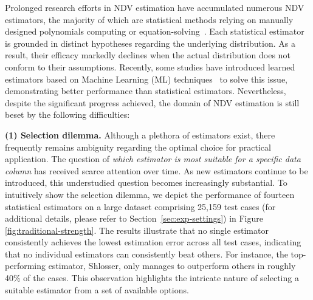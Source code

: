 Prolonged research efforts in NDV estimation have accumulated numerous NDV estimators, the majority of which are statistical methods relying on manually designed polynomials computing or equation-solving~\cite{goodman1949estimation,gee_charikar2000towards,error_bound,chao_in_db_ozsoyoglu1991estimating,chao1984nonparametric,shlosser1981estimation,chaolee,hybskew_haas1995sampling,sichel1986parameter,sichel1986word,sichel1992anatomy,mmo_bunge1993estimating,bootstrap_smith1984nonparametric,horvitz_sarndal1992model,hybskew_haas1995sampling}.
Each statistical estimator is grounded in distinct hypotheses regarding the underlying distribution. As a result, their efficacy markedly declines when the actual distribution does not conform to their assumptions.
Recently, some studies have introduced learned estimators based on Machine Learning (ML) techniques~\cite{li2024learning,ls_wu2022learning} to solve this issue, demonstrating better performance than statistical estimators.
Nevertheless, despite the significant progress achieved, the domain of NDV estimation is still beset by the following difficulties:


\noindent\textbf{(1) Selection dilemma.} 
Although a plethora of estimators exist, there frequently remains ambiguity regarding the optimal choice for practical application.
The question of \textit{which estimator is most suitable for a specific data column} has received scarce attention over time. 
As new estimators continue to be introduced, this understudied question becomes increasingly substantial. 
To intuitively show the selection dilemma, we depict the performance of fourteen statistical estimators on a large dataset comprising 25,159 test cases (for additional details, please refer to Section~\ref{sec:exp-settings}) in Figure \ref{fig:traditional-strength}.
The results illustrate that no single estimator consistently achieves the lowest estimation error across all test cases, {indicating that no individual estimators can consistently beat others}. For instance, the top-performing estimator, Shlosser, only manages to outperform others in roughly 40\% of the cases.  
This observation highlights the intricate nature of selecting a suitable estimator from a set of available options.





